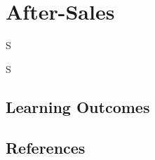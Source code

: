 \frenchspacing
\chapter{After-Sales}
\epigraph{S}{S}

%
\section{Learning Outcomes}

%
\section{References}